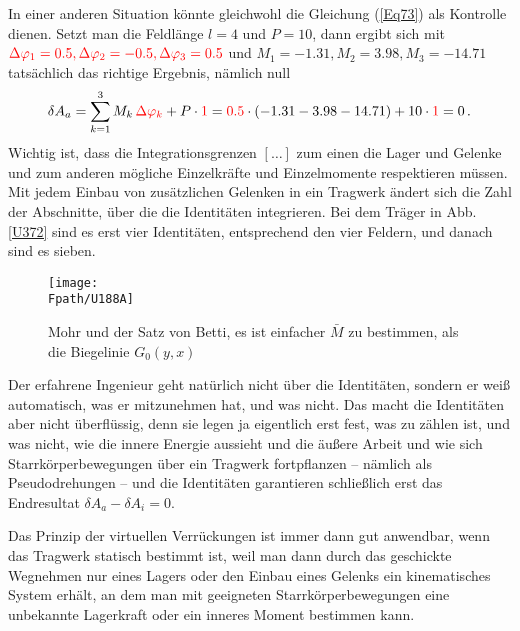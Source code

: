 {{{{In einer anderen Situation k\"{o}nnte gleichwohl die Gleichung (\ref{Eq73}) als Kontrolle dienen. Setzt man die Feldl\"{a}nge $l = 4$ und $P = 10$, dann ergibt sich mit
$\textcolor{red}{\Delta \varphi_1 = 0.5, \Delta \varphi_2 = -0.5, \Delta \varphi_3 = 0.5}$ und $M_1 = -1.31, M_2 = 3.98, M_3 = -14.71$ tats\"{a}chlich das richtige Ergebnis, n\"{a}mlich null
\begin{align}
\delta A_a = \sum_{k = 1}^3 M_k\,\textcolor{red}{\Delta \varphi_k} + P \cdot \textcolor{red}{1 }= \textcolor{red}{0.5} \cdot (- 1.31 - 3.98 - 14.71) + 10 \cdot \textcolor{red}{1} = 0\,.
\end{align}
Wichtig ist, dass die Integrationsgrenzen $[\ldots]$ zum einen die Lager und Gelenke und zum anderen m\"{o}gliche Einzelkr\"{a}fte und Einzelmomente respektieren m\"{u}ssen. Mit jedem Einbau von zus\"{a}tzlichen Gelenken in ein Tragwerk \"{a}ndert sich die Zahl der Abschnitte, \"{u}ber die die Identit\"{a}ten integrieren. Bei dem Tr\"{a}ger in Abb. \ref{U372} sind es erst vier Identit\"{a}ten, entsprechend den vier Feldern, und danach sind es sieben.
\begin{figure}[tbp]
\centering
\if {} \sidecaption \fi
\texttt{[image: \\Fpath/U188A]}
\caption{Mohr und der Satz von Betti, es ist einfacher $\bar{M}$ zu bestimmen, als die Biegelinie $G_0(y,x)$} \label{U188}
\end{figure}%

Der erfahrene Ingenieur geht nat\"{u}rlich nicht \"{u}ber die Identit\"{a}ten, sondern er wei{\ss} automatisch,  was er mitzunehmen hat, und was nicht. Das macht die Identit\"{a}ten aber nicht \"{u}berfl\"{u}ssig, denn sie legen ja eigentlich erst fest, was zu z\"{a}hlen ist, und was nicht, wie die innere Energie aussieht und die \"{a}u{\ss}ere Arbeit und wie sich Starrk\"{o}rperbewegungen \"{u}ber ein Tragwerk fortpflanzen -- n\"{a}mlich als Pseudodrehungen -- und die Identit\"{a}ten garantieren schlie{\ss}lich erst das Endresultat $\delta A_a - \delta A_i = 0$.

Das Prinzip der virtuellen Verr\"{u}ckungen ist immer dann gut anwendbar, wenn das Tragwerk statisch bestimmt ist, weil man dann durch das geschickte Wegnehmen nur eines Lagers oder den Einbau eines Gelenks ein kinematisches System erh\"{a}lt, an dem man mit geeigneten Starrk\"{o}rperbewegungen eine unbekannte Lagerkraft oder ein inneres Moment bestimmen kann.

}}}}
